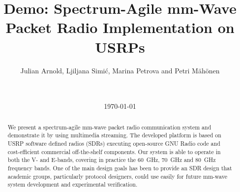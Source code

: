 \documentclass{sig-alternate}
\begin{document}
\title{Demo: Spectrum-Agile mm-Wave Packet Radio Implementation on USRPs}
%
%
%
%
%

%
\author{
%
%
\alignauthor
Julian Arnold, Ljiljana Simi\'{c}, Marina Petrova and Petri M\"ah\"onen\\
       \\
       \\
}

\date{\today}

\maketitle
\begin{abstract}
We present a spectrum-agile mm-wave packet radio communication system and demonstrate it by using multimedia streaming. The developed platform is based on USRP software defined radios (SDRs) executing open-source GNU Radio code and cost-efficient commercial off-the-shelf components. Our system is able to operate in both the V- and E-bands, covering in practice the 60~GHz, 70~GHz and 80~GHz frequency bands. One of the main design goals has been to provide an SDR design that academic groups, particularly protocol designers, could use easily for future mm-wave system development and experimental verification.
\end{abstract}
\end{document}
